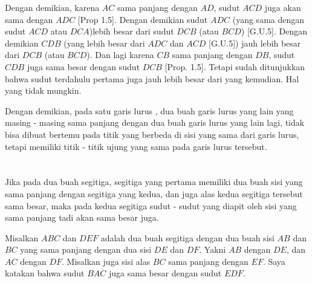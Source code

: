 \documentclass[a4paper]{book}
\begin{document}
Dengan demikian, karena $AC$ sama panjang dengan $AD$, sudut $ACD$ 
juga akan sama dengan $ADC$ [Prop 1.5]. Dengan demikian sudut $ADC$ 
(yang sama dengan sudut $ACD$ atau $DCA$)lebih 
besar dari sudut $DCB$ (atau $BCD$) 
[G.U.5]. Dengan demikian $CDB$ (yang lebih besar dari $ADC$ dan $ACD$ [G.U.5]) 
jauh lebih besar dari $DCB$ (atau $BCD$).
Dan lagi karena $CB$ sama panjang dengan $DB$, sudut $CDB$ juga sama besar
dengan sudut $DCB$ [Prop. 1.5]. Tetapi sudah ditunjukkan bahwa sudut terdahulu 
pertama juga jauh lebih besar dari yang kemudian. Hal yang tidak mungkin.

Dengan demikian, pada satu garis lurus , dua buah garis lurus yang lain yang masing - masing 
sama panjang dengan dua buah garis lurus yang lain lagi, tidak bisa dibuat 
bertemu pada titik yang berbeda di sisi yang sama dari garis lurus, tetapi
memiliki titik - titik ujung yang sama pada garis lurus tersebut.

\section*{\centering \thesection} 
Jika pada dua buah segitiga,  segitiga yang pertama memiliki dua buah sisi 
yang sama panjang dengan segitiga yang kedua, dan juga alas kedua segitiga 
tersebut sama besar, maka pada kedua segitiga sudut - sudut 
yang diapit oleh sisi yang sama panjang tadi akan sama besar juga.

\begin{center}
\end{center}

Misalkan $ABC$ dan $DEF$ adalah dua buah segitiga dengan dua buah sisi 
$AB$ dan $BC$ yang sama panjang dengan dua sisi $DE$ dan $DF$. Yakni
$AB$ dengan $DE$, dan $AC$ dengan $DF$. Misalkan juga sisi alas $BC$ sama
panjang dengan $EF$. Saya katakan bahwa sudut $BAC$ juga sama besar dengan 
sudut $EDF$.
\end{document}
